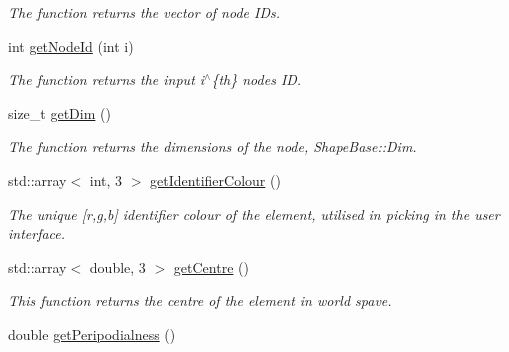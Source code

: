 \begin{DoxyCompactItemize}
\begin{DoxyCompactList}\small\item\em The function returns the vector of node I\+Ds. \end{DoxyCompactList}\item 
\hypertarget{classShapeBase_a586ebd517ab4b08eab7685b3c004b800}{}int \hyperlink{classShapeBase_a586ebd517ab4b08eab7685b3c004b800}{get\+Node\+Id} (int i)\label{classShapeBase_a586ebd517ab4b08eab7685b3c004b800}

\begin{DoxyCompactList}\small\item\em The function returns the input i$^\wedge$\{th\} node\textquotesingle{}s I\+D. \end{DoxyCompactList}\item 
\hypertarget{classShapeBase_aaf9bc340db8e5add7974be8c36e64802}{}size\+\_\+t \hyperlink{classShapeBase_aaf9bc340db8e5add7974be8c36e64802}{get\+Dim} ()\label{classShapeBase_aaf9bc340db8e5add7974be8c36e64802}

\begin{DoxyCompactList}\small\item\em The function returns the dimensions of the node, Shape\+Base\+::\+Dim. \end{DoxyCompactList}\item 
\hypertarget{classShapeBase_a787774fa435981eaba73d4137686783d}{}std\+::array$<$ int, 3 $>$ \hyperlink{classShapeBase_a787774fa435981eaba73d4137686783d}{get\+Identifier\+Colour} ()\label{classShapeBase_a787774fa435981eaba73d4137686783d}

\begin{DoxyCompactList}\small\item\em The unique \mbox{[}r,g,b\mbox{]} identifier colour of the element, utilised in picking in the user interface. \end{DoxyCompactList}\item 
\hypertarget{classShapeBase_aaeddd04a53a677417d8577f031b1ca25}{}std\+::array$<$ double, 3 $>$ \hyperlink{classShapeBase_aaeddd04a53a677417d8577f031b1ca25}{get\+Centre} ()\label{classShapeBase_aaeddd04a53a677417d8577f031b1ca25}

\begin{DoxyCompactList}\small\item\em This function returns the centre of the element in world spave. \end{DoxyCompactList}\item 
\hypertarget{classShapeBase_a90d1eaa5a49262418cee28284da14c16}{}double \hyperlink{classShapeBase_a90d1eaa5a49262418cee28284da14c16}{get\+Peripodialness} ()\label{classShapeBase_a90d1eaa5a49262418cee28284da14c16}


\end{DoxyCompactItemize}
